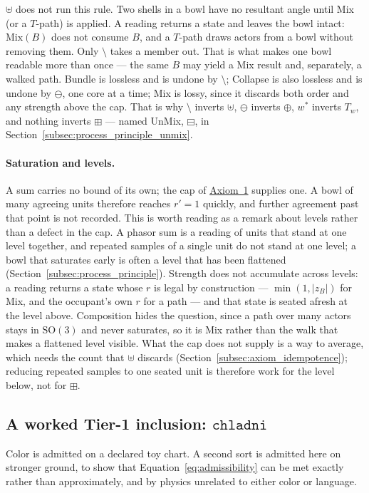 \documentclass[12pt, a4paper]{article}
\begin{document}
$\uplus$ does not run this rule. Two shells in a bowl have no
resultant angle until Mix (or a $T$-path) is applied.
A reading returns a state and leaves the bowl intact: $\mathrm{Mix}(B)$ does not consume $B$, and a $T$-path draws actors from a bowl without
removing them. Only $\setminus$ takes a member out. That is what makes
one bowl readable more than once --- the same $B$ may yield a Mix
result and, separately, a walked path.
Bundle is lossless and is undone by $\setminus$; Collapse is also
lossless and is undone by $\ominus$, one core at a time; Mix
is lossy, since it discards both order and any strength above the
cap. That is why $\setminus$ inverts $\uplus$, $\ominus$ inverts
$\oplus$, $w^{*}$ inverts $T_w$, and nothing inverts $\boxplus$ ---
named UnMix, $\boxminus$, in
Section~\ref{subsec:process_principle_unmix}.

\paragraph{Saturation and levels.}
A sum carries no bound of its own; the cap of
\hyperref[subsec:axiom1]{Axiom~1} supplies one. A bowl of many agreeing units
therefore reaches $r'=1$ quickly, and further agreement past that
point is not recorded. This is worth reading as a remark about levels
rather than a defect in the cap. A phasor sum is a reading of units
that stand at one level together, and repeated samples of a single
unit do not stand at one level; a bowl that saturates early is often a
level that has been flattened
(Section~\ref{subsec:process_principle}). Strength does not
accumulate across levels: a reading returns a state whose $r$ is legal
by construction --- $\min(1,|z_B|)$ for Mix, and the occupant's own
$r$ for a path --- and that state is seated afresh at the level above.
Composition hides the question, since a path over many actors stays in
$\mathrm{SO}(3)$ and never saturates, so it is Mix rather than the
walk that makes a flattened level visible. What the cap does not
supply is a way to average, which needs the count that $\uplus$
discards (Section~\ref{subsec:axiom_idempotence}); reducing repeated
samples to one seated unit is therefore work for the level below, not
for $\boxplus$.

\subsection{A worked Tier-1 inclusion: \texorpdfstring{$\mathtt{chladni}$}{chladni}}
\label{subsec:chladni_inclusion}
Color is admitted on a declared toy chart. A second sort is admitted
here on stronger ground, to show that
Equation~\eqref{eq:admissibility} can be met exactly rather than
approximately, and by physics unrelated to either color or language.
\end{document}

